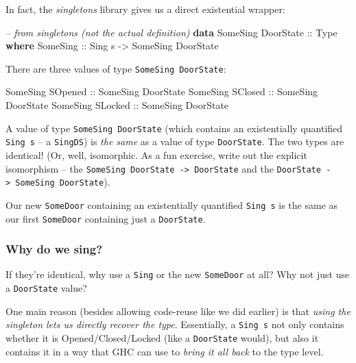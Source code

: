 \documentclass[]{article}
\newenvironment{Shaded}{}{}
\newcommand{\CommentTok}[1]{\textcolor[rgb]{0.38,0.63,0.69}{\textit{#1}}}
\newcommand{\DataTypeTok}[1]{\textcolor[rgb]{0.56,0.13,0.00}{#1}}
\newcommand{\KeywordTok}[1]{\textcolor[rgb]{0.00,0.44,0.13}{\textbf{#1}}}
\newcommand{\NormalTok}[1]{#1}
\newcommand{\OtherTok}[1]{\textcolor[rgb]{0.00,0.44,0.13}{#1}}
\begin{document}
In fact, the \emph{singletons} library gives us a direct existential wrapper:

\begin{Shaded}
\begin{Highlighting}[]
\CommentTok{-- from singletons (not the actual definition)}
\KeywordTok{data} \DataTypeTok{SomeSing} \DataTypeTok{DoorState}\OtherTok{ ::} \DataTypeTok{Type} \KeywordTok{where}
    \DataTypeTok{SomeSing}\OtherTok{ ::} \DataTypeTok{Sing}\NormalTok{ s }\OtherTok{->} \DataTypeTok{SomeSing} \DataTypeTok{DoorState}
\end{Highlighting}
\end{Shaded}

There are three values of type \texttt{SomeSing\ DoorState}:

\begin{Shaded}
\begin{Highlighting}[]
\DataTypeTok{SomeSing} \DataTypeTok{SOpened}\OtherTok{ ::} \DataTypeTok{SomeSing} \DataTypeTok{DoorState}
\DataTypeTok{SomeSing} \DataTypeTok{SClosed}\OtherTok{ ::} \DataTypeTok{SomeSing} \DataTypeTok{DoorState}
\DataTypeTok{SomeSing} \DataTypeTok{SLocked}\OtherTok{ ::} \DataTypeTok{SomeSing} \DataTypeTok{DoorState}
\end{Highlighting}
\end{Shaded}

A value of type \texttt{SomeSing\ DoorState} (which contains an existentially
quantified \texttt{Sing\ s} -- a \texttt{SingDS}) is \emph{the same} as a value
of type \texttt{DoorState}. The two types are identical! (Or, well, isomorphic.
As a fun exercise, write out the explicit isomorphism -- the
\texttt{SomeSing\ DoorState\ -\textgreater{}\ DoorState} and the
\texttt{DoorState\ -\textgreater{}\ SomeSing\ DoorState}).

Our new \texttt{SomeDoor} containing an existentially quantified
\texttt{Sing\ s} is the same as our first \texttt{SomeDoor} containing just a
\texttt{DoorState}.

\hypertarget{why-do-we-sing}{%
\subsubsection{Why do we sing?}\label{why-do-we-sing}}

If they're identical, why use a \texttt{Sing} or the new \texttt{SomeDoor} at
all? Why not just use a \texttt{DoorState} value?

One main reason (besides allowing code-reuse like we did earlier) is that
\emph{using the singleton lets us directly recover the type}. Essentially, a
\texttt{Sing\ s} not only contains whether it is Opened/Closed/Locked (like a
\texttt{DoorState} would), but also it contains it in a way that GHC can use to
\emph{bring it all back} to the type level.
\end{document}
